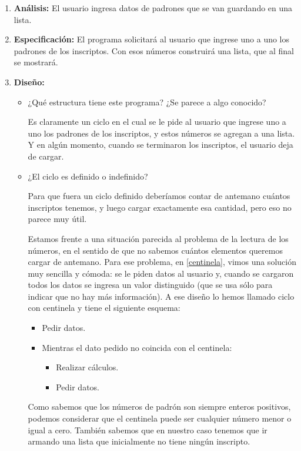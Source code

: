 \begin{enumerate}

\item {\bf Análisis:} El usuario ingresa datos de padrones que se van
guardando en una lista.

\item {\bf Especificación:} El programa solicitará al usuario que ingrese
uno a uno los padrones de los inscriptos. Con esos números construirá una
lista, que al final se mostrará.

\item {\bf Diseño:}
\begin{itemize}
\item ¿Qué estructura tiene este programa? ¿Se parece a algo conocido?

Es claramente un ciclo en el cual se le pide al usuario que ingrese uno a
uno los padrones de los inscriptos, y estos números se agregan a una lista.
Y en algún momento, cuando se terminaron los inscriptos, el usuario deja de
cargar.

\item ¿El ciclo es definido o indefinido?

Para que fuera un ciclo definido deberíamos contar de antemano cuántos
inscriptos tenemos, y luego cargar exactamente esa cantidad, pero eso no
parece muy útil.

Estamos frente a una situación parecida al problema de la lectura de los
números, en el sentido de que no sabemos cuántos elementos queremos cargar
de antemano. Para ese problema, en \ref{centinela}, vimos una solución muy
sencilla y cómoda: se le piden datos al usuario y, cuando se cargaron todos
los datos se ingresa un valor distinguido (que se usa sólo para indicar que
no hay más información). A ese diseño lo hemos llamado ciclo con centinela
y tiene el siguiente esquema:

\begin{itemize}
\item Pedir datos.
\item Mientras el dato pedido no coincida con el centinela:
\begin{itemize}
\item Realizar cálculos.
\item Pedir datos.
\end{itemize}
\end{itemize}

Como sabemos que los números de padrón son siempre enteros positivos,
podemos considerar que el centinela puede ser cualquier número menor o
igual a cero.  También sabemos que en nuestro caso tenemos que ir armando
una lista que inicialmente no tiene ningún inscripto.


\end{itemize}
\end{enumerate}
